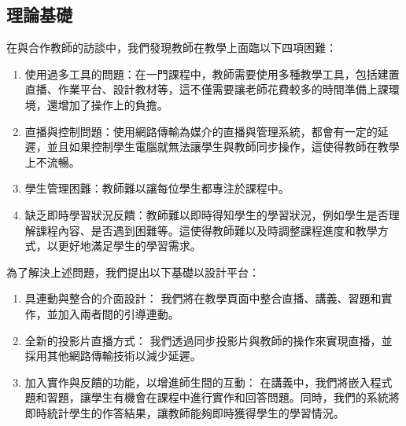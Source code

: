 \documentclass[12pt]{article}
\begin{document}
\subsection{理論基礎}
在與合作教師的訪談中，我們發現教師在教學上面臨以下四項困難：
\begin{enumerate}[label=(\arabic*)]
  \item 使用過多工具的問題：在一門課程中，教師需要使用多種教學工具，包括建置直播、作業平台、設計教材等，這不僅需要讓老師花費較多的時間準備上課環境，還增加了操作上的負擔。
  \item 直播與控制問題：使用網路傳輸為媒介的直播與管理系統，都會有一定的延遲，並且如果控制學生電腦就無法讓學生與教師同步操作，這使得教師在教學上不流暢。
  \item 學生管理困難：教師難以讓每位學生都專注於課程中。
  \item 缺乏即時學習狀況反饋：教師難以即時得知學生的學習狀況，例如學生是否理解課程內容、是否遇到困難等。這使得教師難以及時調整課程進度和教學方式，以更好地滿足學生的學習需求。
\end{enumerate}
\par 為了解決上述問題，我們提出以下基礎以設計平台：
\begin{enumerate}[label=(\arabic*)]
  \item 具連動與整合的介面設計：
  我們將在教學頁面中整合直播、講義、習題和實作，並加入兩者間的引導連動。
  \item 全新的投影片直播方式：
  我們透過同步投影片與教師的操作來實現直播，並採用其他網路傳輸技術以減少延遲。
  \item 加入實作與反饋的功能，以增進師生間的互動：
  在講義中，我們將嵌入程式題和習題，讓學生有機會在課程中進行實作和回答問題。同時，我們的系統將即時統計學生的作答結果，讓教師能夠即時獲得學生的學習情況。
\end{enumerate}
\end{document}
